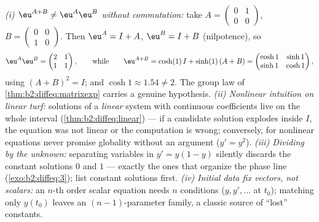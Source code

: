 \begin{remark}
\emph{(i) $\eu^{A+B} \neq \eu^A\eu^B$ without commutation:}
take $A = \begin{pmatrix} 0 & 1\\ 0 & 0\end{pmatrix}$, $B =
\begin{pmatrix} 0 & 0\\ 1 & 0\end{pmatrix}$. Then $\eu^A = I +
A$, $\eu^B = I + B$ (nilpotence), so
\[
\eu^A\eu^B = \begin{pmatrix} 2 & 1\\ 1 & 1\end{pmatrix},
\qquad\text{while}\qquad
\eu^{A+B} = \cosh(1)\,I + \sinh(1)\,(A + B)
= \begin{pmatrix} \cosh 1 & \sinh 1\\ \sinh 1 & \cosh 1
\end{pmatrix},
\]
using $(A+B)^2 = I$; and $\cosh 1 \approx 1.54 \neq 2$. The
group law of \cref{thm:b2:diffeq:matrixexp} carries a genuine
hypothesis. \emph{(ii) Nonlinear intuition on linear turf:}
solutions of a \emph{linear} system with continuous
coefficients live on the whole interval
(\cref{thm:b2:diffeq:linear}) --- if a candidate solution
explodes inside $I$, the equation was not linear or the
computation is wrong; conversely, for nonlinear equations
never promise globality without an argument ($y' = y^2$).
\emph{(iii) Dividing by the unknown:} separating variables in
$y' = y(1-y)$ silently discards the constant solutions $0$ and
$1$ --- exactly the ones that organize the phase line
(\cref{exo:b2:diffeq:3}); list constant solutions first.
\emph{(iv) Initial data fix vectors, not scalars:} an $n$-th
order scalar equation needs $n$ conditions ($y, y', \dots$ at
$t_0$); matching only $y(t_0)$ leaves an
$(n-1)$-parameter family, a classic source of ``lost''
constants.
\end{remark}

